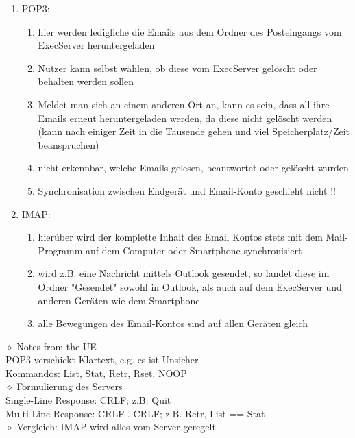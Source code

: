 \documentclass[11pt]{article}
\begin{document}
    \begin{enumerate}
        \item POP3:
        \begin{enumerate}
            \item hier werden ledigliche die Emails aus dem Ordner des Posteingangs
            vom ExecServer heruntergeladen
            \item Nutzer kann selbst wählen, ob diese vom ExecServer gelöscht oder behalten
            werden sollen
            \item Meldet man sich an einem anderen Ort an, kann es sein, dass all ihre Emails
            erneut heruntergeladen werden, da diese nicht gelöscht werden
            (kann nach einiger Zeit in die Tausende gehen und viel Speicherplatz/Zeit beanspruchen)
            \item nicht erkennbar, welche Emails gelesen, beantwortet oder gelöscht wurden
            \item Synchronisation zwischen Endgerät und Email-Konto geschieht nicht !!

        \end{enumerate}

        \item IMAP:
        \begin{enumerate}
            \item hierüber wird der komplette Inhalt des Email Kontos stets mit dem Mail-Programm
            auf dem Computer oder Smartphone synchronisiert
            \item wird z.B. eine Nachricht mittels Outlook gesendet, so landet diese im Ordner "Gesendet"
            sowohl in Outlook, als auch auf dem ExecServer und anderen Geräten wie dem Smartphone
            \item alle Bewegungen des Email-Kontos sind auf allen Geräten gleich

        \end{enumerate}
    \end{enumerate}

    \begin{addmargin}[1em]{1em}
        $\diamond$ Notes from the UE\\
        POP3 verschickt Klartext, e.g. es ist Unsicher\\
        Kommandos: List, Stat, Retr, Rset, NOOP\\

        $\diamond$ Formulierung des Servers\\
        Single-Line Response: CRLF; z.B: Quit\\
        Multi-Line Response: CRLF . CRLF; z.B. Retr, List == Stat\\


        $\diamond$ Vergleich: IMAP wird alles vom Server geregelt
    \end{addmargin}
\end{document}

